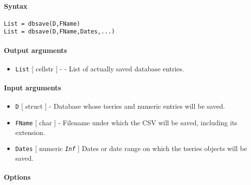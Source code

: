 


	\paragraph{Syntax}\label{syntax}

\begin{verbatim}
List = dbsave(D,FName)
List = dbsave(D,FName,Dates,...)
\end{verbatim}

\paragraph{Output arguments}\label{output-arguments}

\begin{itemize}
\itemsep1pt\parskip0pt
\item
  \texttt{List} {[} cellstr {]} - - List of actually saved database
  entries.
\end{itemize}

\paragraph{Input arguments}\label{input-arguments}

\begin{itemize}
\item
  \texttt{D} {[} struct {]} - Database whose tseries and numeric entries
  will be saved.
\item
  \texttt{FName} {[} char {]} - Filename under which the CSV will be
  saved, including its extension.
\item
  \texttt{Dates} {[} numeric \textbar{} \emph{\texttt{Inf}} {]} Dates or
  date range on which the tseries objects will be saved.
\end{itemize}

\paragraph{Options}\label{options}

